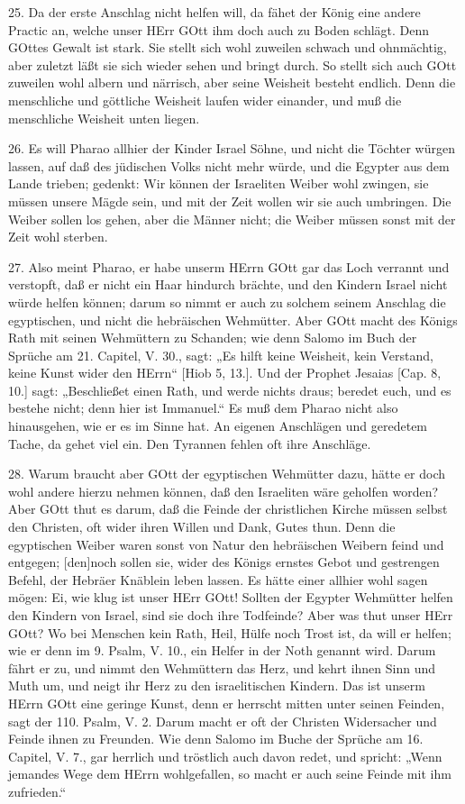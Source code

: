 25. Da der erste Anschlag nicht helfen will, da fähet der König eine andere Practic an, welche unser HErr GOtt ihm doch auch zu Boden schlägt. Denn GOttes Gewalt ist stark. Sie stellt sich wohl zuweilen schwach und ohnmächtig, aber zuletzt läßt sie sich wieder sehen und bringt durch. So stellt sich auch GOtt zuweilen wohl albern und närrisch, aber seine Weisheit besteht endlich. Denn die menschliche und göttliche Weisheit laufen wider einander, und muß die menschliche Weisheit unten liegen.

26. Es will Pharao allhier der Kinder Israel Söhne, und nicht die Töchter würgen lassen, auf daß des jüdischen Volks nicht mehr würde, und die Egypter aus dem Lande trieben; gedenkt: Wir können der Israeliten Weiber wohl zwingen, sie müssen unsere Mägde sein, und mit der Zeit wollen wir sie auch umbringen. Die Weiber sollen los gehen, aber die Männer nicht; die Weiber müssen sonst mit der Zeit wohl sterben.

27. Also meint Pharao, er habe unserm HErrn GOtt gar das Loch verrannt und verstopft, daß er nicht ein Haar hindurch brächte, und den Kindern Israel nicht würde helfen können; darum so nimmt er auch zu solchem seinem Anschlag die egyptischen, und nicht die hebräischen Wehmütter. Aber GOtt macht des Königs Rath mit seinen Wehmüttern zu Schanden; wie denn Salomo im Buch der Sprüche am 21. Capitel, V. 30., sagt: „Es hilft keine Weisheit, kein Verstand, keine Kunst wider den HErrn“ [Hiob 5, 13.]. Und der Prophet Jesaias [Cap. 8, 10.] sagt: „Beschließet einen Rath, und werde nichts draus; beredet euch, und es bestehe nicht; denn hier ist Immanuel.“ Es muß dem Pharao nicht also hinausgehen, wie er es im Sinne hat. An eigenen Anschlägen und geredetem Tache, da gehet viel ein. Den Tyrannen fehlen oft ihre Anschläge.

28. Warum braucht aber GOtt der egyptischen Wehmütter dazu, hätte er doch wohl andere hierzu nehmen können, daß den Israeliten wäre geholfen worden? Aber GOtt thut es darum, daß die Feinde der christlichen Kirche müssen selbst den Christen, oft wider ihren Willen und Dank, Gutes thun. Denn die egyptischen Weiber waren sonst von Natur den hebräischen Weibern feind und entgegen; [den]noch sollen sie, wider des Königs ernstes Gebot und gestrengen Befehl, der Hebräer Knäblein leben lassen. Es hätte einer allhier wohl sagen mögen: Ei, wie klug ist unser HErr GOtt! Sollten der Egypter Wehmütter helfen den Kindern von Israel, sind sie doch ihre Todfeinde? Aber was thut unser HErr GOtt? Wo bei Menschen kein Rath, Heil, Hülfe noch Trost ist, da will er helfen; wie er denn im 9. Psalm, V. 10., ein Helfer in der Noth genannt wird. Darum fährt er zu, und nimmt den Wehmüttern das Herz, und kehrt ihnen Sinn und Muth um, und neigt ihr Herz zu den israelitischen Kindern. Das ist unserm HErrn GOtt eine geringe Kunst, denn er herrscht mitten unter seinen Feinden, sagt der 110. Psalm, V. 2. Darum macht er oft der Christen Widersacher und Feinde ihnen zu Freunden. Wie denn Salomo im Buche der Sprüche am 16. Capitel, V. 7., gar herrlich und tröstlich auch davon redet, und spricht: „Wenn jemandes Wege dem HErrn wohlgefallen, so macht er auch seine Feinde mit ihm zufrieden.“

